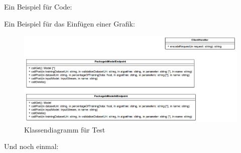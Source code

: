 Ein Beispiel für Code:

Ein Beispiel für das Einfügen einer Grafik:
\begin{figure}[H]
\centering
\includegraphics[width=0.7\linewidth]{Grafik/Diagramme/Restschnittstelle}
\caption[Test-Klassendiagramm]{Klassendiagramm für Test}
\label{fig:REST-Interface}
\end{figure}
Und noch einmal:
